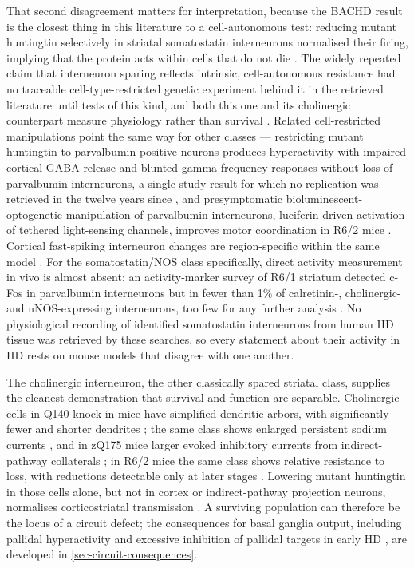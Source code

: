\documentclass[11pt]{article}
\begin{document}
That second disagreement matters for interpretation, because the BACHD result is the closest thing in this literature to a cell-autonomous test: reducing mutant huntingtin selectively in striatal somatostatin interneurons normalised their firing, implying that the protein acts within cells that do not die \citep{Fowler2026}. The widely repeated claim that interneuron sparing reflects intrinsic, cell-autonomous resistance had no traceable cell-type-restricted genetic experiment behind it in the retrieved literature until tests of this kind, and both this one and its cholinergic counterpart measure physiology rather than survival \citep{Fowler2026,Pancani2023}. Related cell-restricted manipulations point the same way for other classes --- restricting mutant huntingtin to parvalbumin-positive neurons produces hyperactivity with impaired cortical GABA release and blunted gamma-frequency responses without loss of parvalbumin interneurons, a single-study result for which no replication was retrieved in the twelve years since \citep{Dougherty2014}, and presymptomatic bioluminescent-optogenetic manipulation of parvalbumin interneurons, luciferin-driven activation of tethered light-sensing channels, improves motor coordination in R6/2 mice \citep{Ikefuama2025}. Cortical fast-spiking interneuron changes are region-specific within the same model \citep{Wang2023a}. For the somatostatin/NOS class specifically, direct activity measurement in vivo is almost absent: an activity-marker survey of R6/1 striatum detected c-Fos in parvalbumin interneurons but in fewer than 1\% of calretinin-, cholinergic- and nNOS-expressing interneurons, too few for any further analysis \citep{Cabanas2017}. No physiological recording of identified somatostatin interneurons from human HD tissue was retrieved by these searches, so every statement about their activity in HD rests on mouse models that disagree with one another.

The cholinergic interneuron, the other classically spared striatal class, supplies the cleanest demonstration that survival and function are separable. Cholinergic cells in Q140 knock-in mice have simplified dendritic arbors, with significantly fewer and shorter dendrites \citep{Deng2016}; the same class shows enlarged persistent sodium currents \citep{Tanimura2016}, and in zQ175 mice larger evoked inhibitory currents from indirect-pathway collaterals \citep{Lim2021}; in R6/2 mice the same class shows relative resistance to loss, with reductions detectable only at later stages \citep{CrevierSorbo2020}. Lowering mutant huntingtin in those cells alone, but not in cortex or indirect-pathway projection neurons, normalises corticostriatal transmission \citep{Pancani2023}. A surviving population can therefore be the locus of a circuit defect; the consequences for basal ganglia output, including pallidal hyperactivity and excessive inhibition of pallidal targets in early HD \citep{Callahan2022}, are developed in \ref{sec-circuit-consequences}.
\end{document}
